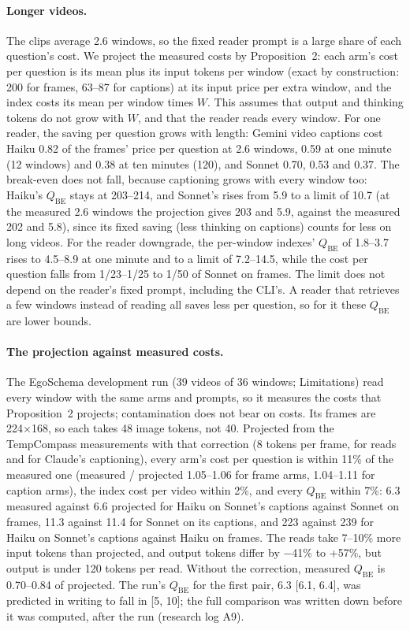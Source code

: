 \documentclass[11pt]{article}
\newcommand{\qbe}{\ensuremath{Q_{\mathrm{BE}}}}
\begin{document}
\paragraph{Longer videos.} The clips average 2.6 windows, so the fixed reader prompt is a large share of each question's cost. We project the measured costs by Proposition~2: each arm's cost per question is its mean plus its input tokens per window (exact by construction: 200 for frames, 63--87 for captions) at its input price per extra window, and the index costs its mean per window times $W$. This assumes that output and thinking tokens do not grow with $W$, and that the reader reads every window. For one reader, the saving per question grows with length: Gemini video captions cost Haiku 0.82 of the frames' price per question at 2.6 windows, 0.59 at one minute (12 windows) and 0.38 at ten minutes (120), and Sonnet 0.70, 0.53 and 0.37. The break-even does not fall, because captioning grows with every window too: Haiku's \qbe{} stays at 203--214, and Sonnet's rises from 5.9 to a limit of 10.7 (at the measured 2.6 windows the projection gives 203 and 5.9, against the measured 202 and 5.8), since its fixed saving (less thinking on captions) counts for less on long videos. For the reader downgrade, the per-window indexes' \qbe{} of 1.8--3.7 rises to 4.5--8.9 at one minute and to a limit of 7.2--14.5, while the cost per question falls from 1/23--1/25 to 1/50 of Sonnet on frames. The limit does not depend on the reader's fixed prompt, including the CLI's. A reader that retrieves a few windows instead of reading all saves less per question, so for it these \qbe{} are lower bounds.

\paragraph{The projection against measured costs.} The EgoSchema development run (39 videos of 36 windows; Limitations) read every window with the same arms and prompts, so it measures the costs that Proposition~2 projects; contamination does not bear on costs. Its frames are 224×168, so each takes 48 image tokens, not 40. Projected from the TempCompass measurements with that correction (8 tokens per frame, for reads and for Claude's captioning), every arm's cost per question is within 11\% of the measured one (measured / projected 1.05--1.06 for frame arms, 1.04--1.11 for caption arms), the index cost per video within 2\%, and every \qbe{} within 7\%: 6.3 measured against 6.6 projected for Haiku on Sonnet's captions against Sonnet on frames, 11.3 against 11.4 for Sonnet on its captions, and 223 against 239 for Haiku on Sonnet's captions against Haiku on frames. The reads take 7--10\% more input tokens than projected, and output tokens differ by −41\% to +57\%, but output is under 120 tokens per read. Without the correction, measured \qbe{} is 0.70--0.84 of projected. The run's \qbe{} for the first pair, 6.3 [6.1, 6.4], was predicted in writing to fall in [5, 10]; the full comparison was written down before it was computed, after the run (research log A9).
\end{document}

